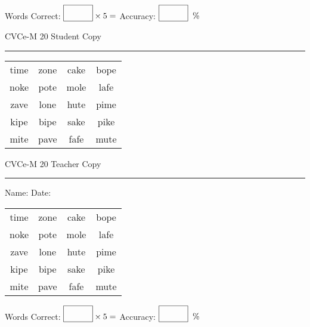 \documentclass{memoir}
\begin{document}
\small

Words Correct: $\fbox{\phantom{\huge 100}} \times 5 = $ Accuracy: $\fbox{\phantom{\huge 100}}\;\; \%$ 

\vfill

\newpage



\footnotesize \noindent
CVCe-M 20 \hfill Student Copy
\smallskip
\hrule

\Large

\setlength{\tabcolsep}{14pt}
\def\arraystretch{2}

{\selectfont


\begin{vplace}[0.5]
\begin{center}
\begin{tabular}{cccc}
time & zone & cake & bope \\
noke & pote & mole & lafe \\
zave & lone & hute & pime \\
kipe & bipe & sake & pike \\
mite & pave & fafe & mute \\
\end{tabular}
\end{center}
\end{vplace}

}

\newpage

\footnotesize \noindent
CVCe-M 20 \hfill Teacher Copy
\smallskip
\hrule

\small

\vfill

\noindent
Name: \underline{\hspace{1.75in}} \hfill Date: \underline{\hspace{1in}}

\Large

{\selectfont


\begin{vplace}[0.5]
\begin{center}
\begin{tabular}{cccc}
time & zone & cake & bope \\
noke & pote & mole & lafe \\
zave & lone & hute & pime \\
kipe & bipe & sake & pike \\
mite & pave & fafe & mute \\
\end{tabular}
\end{center}
\end{vplace}



}

\small

Words Correct: $\fbox{\phantom{\huge 100}} \times 5 = $ Accuracy: $\fbox{\phantom{\huge 100}}\;\; \%$ 

\vfill

\end{document}
